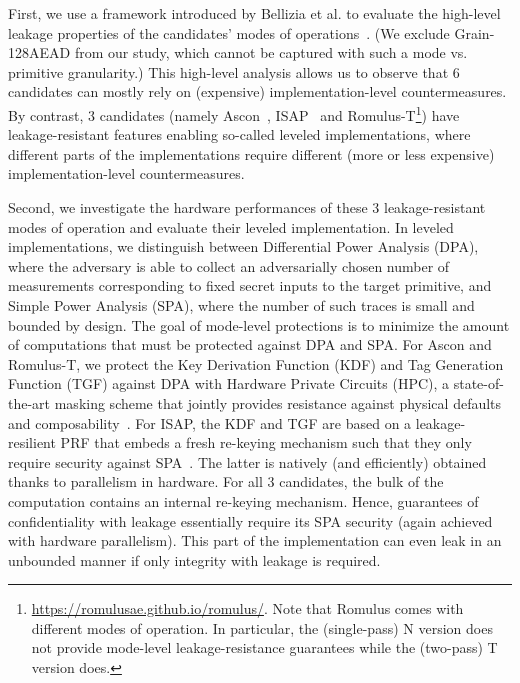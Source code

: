 \documentclass{llncs}
\begin{document}
First, we use a framework introduced by Bellizia et al. to evaluate the
high-level leakage properties of the candidates' modes of 
operations~\cite{DBLP:conf/crypto/BelliziaBCGGMPP20}.
(We exclude Grain-128AEAD from our study, which 
cannot be captured with such a mode vs. primitive granularity.)
This high-level analysis allows us to observe that 6 candidates 
can mostly rely on (expensive) implementation-level countermeasures.
By contrast, 3 candidates (namely Ascon~\cite{DBLP:journals/joc/DobraunigEMS21}, ISAP~\cite{DBLP:journals/tosc/DobraunigEMMMPU20} and Romulus-T\footnote{\url{https://romulusae.github.io/romulus/}. Note that Romulus comes with different modes of operation. In particular, the (single-pass) N version does not 
provide mode-level leakage-resistance guarantees while the (two-pass) T version does.}) have leakage-resistant features
enabling so-called leveled implementations, where different parts of the implementations
require different (more or less expensive) implementation-level countermeasures.

\medskip

Second, we investigate the hardware performances of these 3 leakage-resistant
modes of operation and evaluate their leveled implementation.
In leveled implementations, we distinguish between Differential Power Analysis
(DPA), where the adversary is able to collect an adversarially chosen
number of measurements corresponding to fixed secret inputs to the target
primitive, and Simple Power Analysis (SPA), where the number of such
traces is small and bounded by design. The goal of mode-level protections
is to minimize the 
amount of computations that must be protected against DPA and SPA.
For Ascon and Romulus-T, we protect
the Key Derivation Function (KDF) and Tag Generation Function (TGF) 
against DPA with Hardware Private Circuits (HPC), 
a state-of-the-art masking scheme that jointly provides resistance against physical defaults and 
composability~\cite{DBLP:journals/tc/CassiersGLS21,DBLP:journals/tches/CassiersS21}. For ISAP, the
KDF and TGF are based on a leakage-resilient PRF that embeds a fresh re-keying mechanism
such that they only require
security against SPA~\cite{DBLP:conf/africacrypt/MedwedSGR10,DBLP:journals/jce/BelaidSHMMSST14}. The latter is natively (and efficiently) obtained
thanks to parallelism in hardware. 
For all 3 candidates, the bulk of the computation contains an internal re-keying mechanism. Hence,
guarantees of confidentiality with leakage essentially require its SPA security (again achieved with hardware parallelism). This part of the implementation can even leak in an unbounded manner if only integrity with leakage is required.
\end{document}
